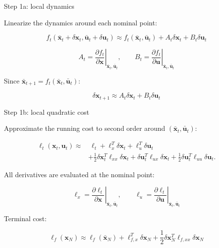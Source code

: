 \documentclass[aspectratio=169]{beamer}
\begin{document}
\begin{frame}[t]{Step 1a: local dynamics}
\large

Linearize the dynamics around each nominal point:

\[
f_t(\bar{\bm{x}}_t+\delta\bm{x}_t,\bar{\bm{u}}_t+\delta\bm{u}_t)
\approx
f_t(\bar{\bm{x}}_t,\bar{\bm{u}}_t)
+
A_t\delta\bm{x}_t
+
B_t\delta\bm{u}_t
\]

\[
A_t=
\left.\frac{\partial f_t}{\partial \bm{x}}\right|_{\bar{\bm{x}}_t,\bar{\bm{u}}_t},
\qquad
B_t=
\left.\frac{\partial f_t}{\partial \bm{u}}\right|_{\bar{\bm{x}}_t,\bar{\bm{u}}_t}
\]

Since $\bar{\bm{x}}_{t+1}=f_t(\bar{\bm{x}}_t,\bar{\bm{u}}_t)$:

\[
\delta\bm{x}_{t+1}
\approx
A_t\delta\bm{x}_t+B_t\delta\bm{u}_t
\]

\end{frame}

\begin{frame}[t]{Step 1b: local quadratic cost}
\small

Approximate the running cost to second order around
$(\bar{\bm{x}}_t,\bar{\bm{u}}_t)$:

\[
\begin{aligned}
\ell_t(\bm{x}_t,\bm{u}_t)
\approx
&\ \ell_t
+
\ell_x^T\delta\bm{x}_t
+
\ell_u^T\delta\bm{u}_t \\
&+
\frac{1}{2}\delta\bm{x}_t^T\ell_{xx}\delta\bm{x}_t
+
\delta\bm{u}_t^T\ell_{ux}\delta\bm{x}_t
+
\frac{1}{2}\delta\bm{u}_t^T\ell_{uu}\delta\bm{u}_t .
\end{aligned}
\]

All derivatives are evaluated at the nominal point:

\[
\ell_x=
\left.\frac{\partial \ell_t}{\partial \bm{x}}\right|_{\bar{\bm{x}}_t,\bar{\bm{u}}_t},
\qquad
\ell_u=
\left.\frac{\partial \ell_t}{\partial \bm{u}}\right|_{\bar{\bm{x}}_t,\bar{\bm{u}}_t}
\]

Terminal cost:

\[
\ell_f(\bm{x}_N)
\approx
\ell_f(\bar{\bm{x}}_N)
+
\ell_{f,x}^T\delta\bm{x}_N
+
\frac{1}{2}\delta\bm{x}_N^T\ell_{f,xx}\delta\bm{x}_N
\]

\end{frame}
\end{document}
